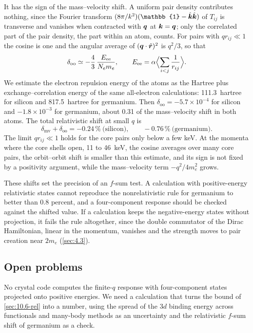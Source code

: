 It has the sign of the mass--velocity shift. A uniform pair density contributes nothing, since the Fourier transform $(8\pi/k^2)(\mathbb{1} - \hat{\vect{k}}\hat{\vect{k}})$ of $T_{ij}$ is transverse and vanishes when contracted with $\bm{q}$ at $\bm{k} = \bm{q}$; only the correlated part of the pair density, the part within an atom, counts. For pairs with $qr_{ij} \ll 1$ the cosine is one and the angular average of $(\bm{q}\cdot\hat{\bm{r}})^2$ is $q^2/3$, so that
\begin{equation*}
  \delta_{\mathrm{oo}} \simeq -\frac43\,\frac{E_{\mathrm{ee}}}{N_em_e} , \qquad E_{\mathrm{ee}} = \alpha\Bigl\langle\sum_{i<j}\frac{1}{r_{ij}}\Bigr\rangle .
\end{equation*}
We estimate the electron repulsion energy of the atoms as the Hartree plus exchange--correlation energy of the same all-electron calculations: \SI{111.3}{hartree} for silicon and \SI{817.5}{hartree} for germanium. Then $\delta_{\mathrm{oo}} = -5.7\times10^{-4}$ for silicon and $-1.8\times10^{-3}$ for germanium, about 0.31 of the mass--velocity shift in both atoms. The total relativistic shift at small $q$ is
\begin{equation*}
  \delta_{\mathrm{mv}} + \delta_{\mathrm{oo}} = -0.24\,\% \ \text{(silicon)}, \qquad -0.76\,\% \ \text{(germanium)} .
\end{equation*}
The limit $qr_{ij} \ll 1$ holds for the core pairs only below a few keV. At the momenta where the core shells open, 11 to \SI{46}{keV}, the cosine averages over many core pairs, the orbit--orbit shift is smaller than this estimate, and its sign is not fixed by a positivity argument, while the mass--velocity term $-q^2/4m_e^2$ grows.

These shifts set the precision of an $f$-sum test. A calculation with positive-energy relativistic states cannot reproduce the nonrelativistic rule for germanium to better than 0.8 percent, and a four-component response should be checked against the shifted value. If a calculation keeps the negative-energy states without projection, it fails the rule altogether, since the double commutator of the Dirac Hamiltonian, linear in the momentum, vanishes and the strength moves to pair creation near $2m_e$ (\cref{sec:4.3}).

\subsection{Open problems}\label{sec:10.6-open}

No crystal code computes the finite-$q$ response with four-component states projected onto positive energies. We need a calculation that turns the bound of \cref{sec:10.6-rel} into a number, using the spread of the $3d$ binding energy across functionals and many-body methods as an uncertainty and the relativistic $f$-sum shift of germanium as a check.

